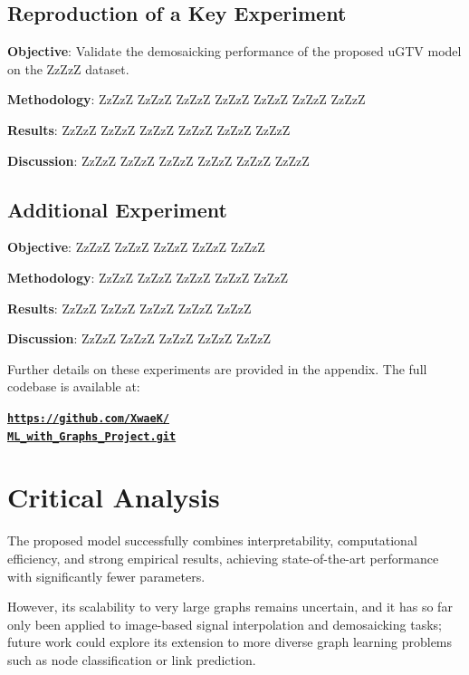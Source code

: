 \documentclass{article}
\theoremstyle{plain}
\theoremstyle{definition}
\theoremstyle{remark}
\begin{document}
\subsection{Reproduction of a Key Experiment}


\textbf{Objective}: Validate the demosaicking performance of the proposed uGTV model on the ZzZzZ dataset.

\textbf{Methodology}: ZzZzZ ZzZzZ ZzZzZ ZzZzZ ZzZzZ ZzZzZ ZzZzZ 

\textbf{Results}: ZzZzZ ZzZzZ ZzZzZ ZzZzZ ZzZzZ ZzZzZ 

\textbf{Discussion}: ZzZzZ ZzZzZ ZzZzZ ZzZzZ ZzZzZ ZzZzZ 

\subsection{Additional Experiment}

\textbf{Objective}: ZzZzZ ZzZzZ ZzZzZ ZzZzZ ZzZzZ 

\textbf{Methodology}: ZzZzZ ZzZzZ ZzZzZ ZzZzZ ZzZzZ 

\textbf{Results}: ZzZzZ ZzZzZ ZzZzZ ZzZzZ ZzZzZ 

\textbf{Discussion}: ZzZzZ ZzZzZ ZzZzZ ZzZzZ ZzZzZ 

Further details on these experiments are provided in the appendix. The full codebase is available at:
\begin{center}
\vskip -0.1in
\href{https://github.com/XwaeK/ML_with_Graphs_Project.git}{\textbf{\texttt{https://github.com/XwaeK/\\ML\_with\_Graphs\_Project.git}}}
\vskip -0.1in
\end{center}

\section{Critical Analysis}

The proposed model successfully combines interpretability, computational efficiency, and strong empirical results, achieving state-of-the-art performance with significantly fewer parameters.

However, its scalability to very large graphs remains uncertain, and it has so far only been applied to image-based signal interpolation and demosaicking tasks; future work could explore its extension to more diverse graph learning problems such as node classification or link prediction.
\end{document}
